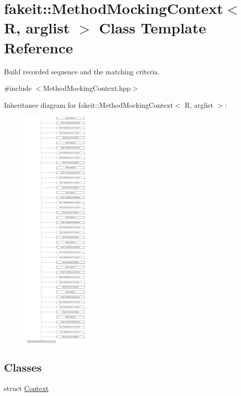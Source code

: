 \hypertarget{classfakeit_1_1MethodMockingContext}{}\section{fakeit\+::Method\+Mocking\+Context$<$ R, arglist $>$ Class Template Reference}
\label{classfakeit_1_1MethodMockingContext}


Build recorded sequence and the matching criteria.  




{\ttfamily \#include $<$Method\+Mocking\+Context.\+hpp$>$}

Inheritance diagram for fakeit\+::Method\+Mocking\+Context$<$ R, arglist $>$\+:\begin{figure}[H]
\begin{center}
\leavevmode
\includegraphics[height=12.000000cm]{classfakeit_1_1MethodMockingContext}
\end{center}
\end{figure}
\subsection*{Classes}
\begin{DoxyCompactItemize}
\item 
struct \mbox{\hyperlink{structfakeit_1_1MethodMockingContext_1_1Context}{Context}}
\end{DoxyCompactItemize}
